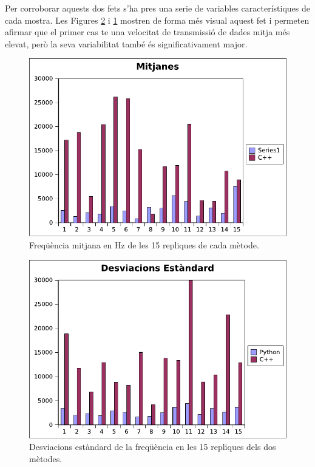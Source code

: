 \documentclass[12pt,a4paper,final,twoside]{article}
\begin{document}
Per corroborar aquests dos fets s'ha pres una serie de variables característiques de cada mostra. Les Figures \ref{fig:DevOneLeg} i \ref{fig:MitOneLeg} mostren de forma més visual aquest fet i permeten afirmar que el primer cas  te una velocitat de transmissió de dades mitja més elevat, però la seva variabilitat també és significativament major.

\begin{figure}[H]
	\centering
    \includegraphics[scale=1]{images/mitjanesOneLeg.pdf}
	 \caption{Freqüència mitjana en Hz de les 15 repliques de cada mètode.}
  \label{fig:MitOneLeg}
\end{figure}
\begin{figure}[H]
	\centering
    \includegraphics[scale=1]{images/DevOneLeg.pdf}
	 \caption{Desviacions estàndard de la freqüència en les 15 repliques dels dos mètodes.}
  \label{fig:DevOneLeg}
\end{figure}
\end{document}
